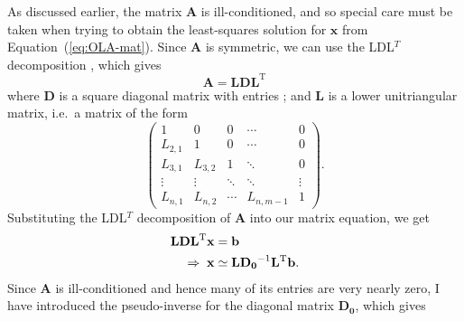 As discussed earlier, the matrix $\mathbf{A}$ is ill-conditioned, and so special care must be taken when trying to obtain the least-squares solution for $\mathbf{x}$ from Equation~(\ref{eq:OLA-mat}). 
Since $\mathbf{A}$ is symmetric, we can use the LDL$^T$ decomposition \citep[e.g.,][]{banerjee2014linear}, which gives 
\begin{equation}
    \mathbf{A} = \mathbf{LDL}^{\text{T}}
\end{equation}
where $\mathbf{D}$ is a square diagonal matrix with entries ; and $\mathbf{L}$ is a lower unitriangular matrix, i.e.\ a matrix of the form %
\begin{equation} \label{eq:lower-diag}
    \begin{pmatrix}
        1       &   0     & 0      & \cdots & 0 \\[3mm]
        L_{2,1} &   1     & 0      & \cdots & 0 \\[3mm]
        L_{3,1} & L_{3,2} & 1      & \ddots & 0 \\[3mm]
        \vdots  & \vdots  & \ddots & \ddots & \vdots \\[3mm]
        L_{n,1} & L_{n,2} & \cdots & L_{n,m-1} & 1
    \end{pmatrix}.
\end{equation}
Substituting the LDL$^T$ decomposition of $\mathbf A$ into our matrix equation, we get
\begin{align}
    \mathbf{LDL}^{\text{T}} \mathbf{x} &= \mathbf{b} \notag\\
    \Rightarrow\; \mathbf{x} &\simeq \mathbf{LD_0}^{-1}\mathbf{L}^{\text{T}}\mathbf{b}.
\end{align}
Since $\mathbf{A}$ is ill-conditioned and hence many of its entries are very nearly zero, I have introduced the pseudo-inverse for the diagonal matrix $\mathbf{D_0}$, which gives 
